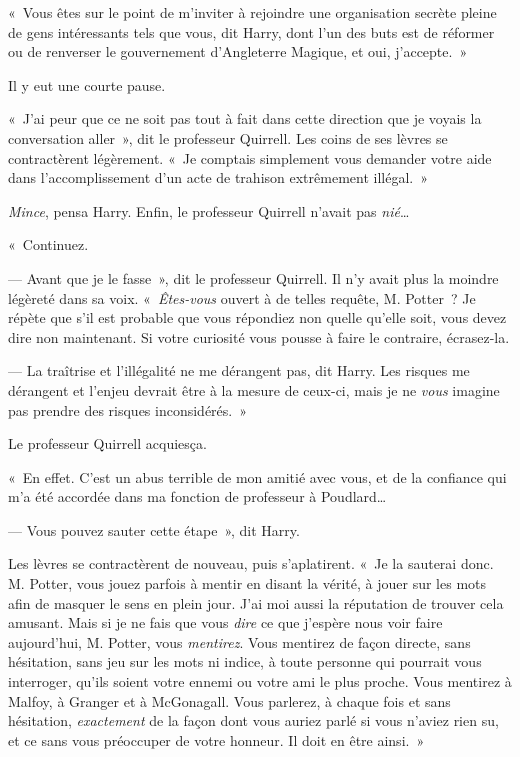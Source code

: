 «~Vous êtes sur le point de m'inviter à rejoindre une organisation secrète pleine de gens intéressants tels que vous, dit Harry, dont l'un des buts est de réformer ou de renverser le gouvernement d'Angleterre Magique, et oui, j'accepte.~»

Il y eut une courte pause.

«~J'ai peur que ce ne soit pas tout à fait dans cette direction que je voyais la conversation aller~», dit le professeur Quirrell.
Les coins de ses lèvres se contractèrent légèrement.
«~Je comptais simplement vous demander votre aide dans l'accomplissement d'un acte de trahison extrêmement illégal.~»

\emph{Mince}, pensa Harry.
Enfin, le professeur Quirrell n'avait pas \emph{nié}…

«~Continuez.

--- Avant que je le fasse~», dit le professeur Quirrell.
Il n'y avait plus la moindre légèreté dans sa voix.
«~\emph{Êtes-vous} ouvert à de telles requête, M. Potter~?
Je répète que s'il est probable que vous répondiez non quelle qu'elle soit, vous devez dire non maintenant.
Si votre curiosité vous pousse à faire le contraire, écrasez-la.

--- La traîtrise et l'illégalité ne me dérangent pas, dit Harry.
Les risques me dérangent et l'enjeu devrait être à la mesure de ceux-ci, mais je ne \emph{vous} imagine pas prendre des risques inconsidérés.~»

Le professeur Quirrell acquiesça.

«~En effet.
C'est un abus terrible de mon amitié avec vous, et de la confiance qui m'a été accordée dans ma fonction de professeur à Poudlard…

--- Vous pouvez sauter cette étape~», dit Harry.

Les lèvres se contractèrent de nouveau, puis s'aplatirent.
«~Je la sauterai donc.
M. Potter, vous jouez parfois à mentir en disant la vérité, à jouer sur les mots afin de masquer le sens en plein jour.
J'ai moi aussi la réputation de trouver cela amusant.
Mais si je ne fais que vous \emph{dire} ce que j'espère nous voir faire aujourd'hui, M. Potter, vous \emph{mentirez}.
Vous mentirez de façon directe, sans hésitation, sans jeu sur les mots ni indice, à toute personne qui pourrait vous interroger, qu'ils soient votre ennemi ou votre ami le plus proche.
Vous mentirez à Malfoy, à Granger et à McGonagall.
Vous parlerez, à chaque fois et sans hésitation, \emph{exactement} de la façon dont vous auriez parlé si vous n'aviez rien su, et ce sans vous préoccuper de votre honneur.
Il doit en être ainsi.~»


